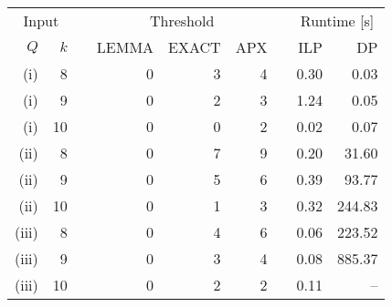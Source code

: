 \begin{tabular}{rrrrrrrrr}
  \toprule
\multicolumn{2}{c}{ Input } & & \multicolumn{3}{c}{ Threshold } & & \multicolumn{2}{c}{ Runtime [s] }\\
\cmidrule{1-2} \cmidrule{4-6} \cmidrule{8-9}
$Q$ & $k$ & & LEMMA & EXACT & APX & & ILP & DP \\ 
  \midrule
(i) &  8  & &   0 &   3 &   4 & & 0.30 & 0.03 \\ 
(i) &  9  & &   0 &   2 &   3 & & 1.24 & 0.05 \\ 
(i) &  10 & &   0 &   0 &   2 & & 0.02 & 0.07 \\ 
  \midrule
(ii) &  8  & &   0 &   7 &   9 & & 0.20 & 31.60 \\ 
(ii) &  9  & &   0 &   5 &   6 & & 0.39 & 93.77 \\ 
(ii) &  10 & &   0 &   1 &   3 & & 0.32 & 244.83 \\ 
  \midrule
(iii) &  8  & &   0 &   4 &   6 & & 0.06 & 223.52 \\ 
(iii) &  9  & &   0 &   3 &   4 & & 0.08 & 885.37 \\ 
(iii) &  10 & &   0 &   2 &   2 & & 0.11 & -- \\ 
   \bottomrule
\end{tabular}
